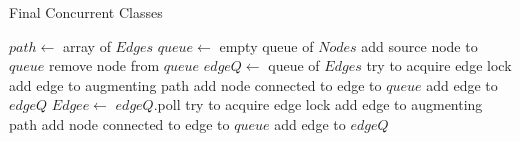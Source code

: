\begin{algorithm} 
\caption{Final Concurrent Classes}
\label{EKClassesFinal}
    \begin{algorithmic}[1]
            \State $path \gets$ array of $Edges$
            \State $queue \gets$ empty queue of $Nodes$
            \State add source node to $queue$
                \State remove node from $queue$
                \State $edgeQ \gets$ queue of $Edges$ 
                        \State try to acquire edge lock
                            \State add edge to augmenting path
                            \State add node connected to edge to $queue$
                        \Else
                            \State add edge to $edgeQ$
                        \EndIf
                    \EndIf
                \EndFor
                    \State $Edge e \gets$ $edgeQ$.poll
                        \State try to acquire edge lock
                            \State add edge to augmenting path
                            \State add node connected to edge to $queue$
                        \Else
                            \State add edge to $edgeQ$
                        \EndIf
                    \EndIf
                \EndWhile        
            \EndWhile
        \EndFunction
    \end{algorithmic}   
\end{algorithm}

\clearpage